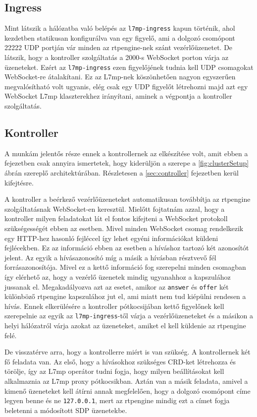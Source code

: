 \subsection{Ingress}

Mint látszik a hálózatba való belépés az \texttt{l7mp-ingress} kapun történik, ahol 
kezdetben statikusan konfigurálva van egy figyelő, ami a dolgozó csomópont 22222 UDP 
portján vár minden az rtpengine-nek szánt vezérlőüzenetet. De látszik, hogy a kontroller 
szolgáltatás a 2000-s WebSocket porton várja az üzeneteket. Ezért az 
\texttt{l7mp-ingress} ezen figyelőjének tudnia kell UDP csomagokat WebSocket-re 
átalakítani. Ez az L7mp-nek köszönhetően nagyon egyszerűen megvalósítható volt ugyanis, 
elég csak egy UDP figyelőt létrehozni majd azt egy WebSocket L7mp klaszterekhez 
irányítani, aminek a végpontja a kontroller szolgáltatás. 

\subsection{Kontroller}

A munkám jelentős része ennek a kontrollernek az elkészítése volt, amit ebben a
fejezetben csak annyira ismertetek, hogy kiderüljön a szerepe a \ref{fig:clusterSetup}
ábrán szereplő architektúrában. Részletesen a \ref{sec:controller} fejezetben kerül 
kifejtésre. 

A kontroller a beérkező vezérlőüzeneteket automatikusan továbbítja az rtpengine 
szolgáltatásnak WebSocket-en keresztül. Mielőtt fojtatnám azzal, hogy a kontroller milyen 
feladatokat lát el fontos kifejteni a WebSocket protokoll szükségességét ebben az esetben.
Mivel minden WebSocket csomag rendelkezik egy HTTP-hez hasonló fejléccel így
lehet egyéni információkat küldeni fejlécekben. Ez az információ ebben az esetben a 
híváshoz tartozó  két azonosítót jelent. Az egyik a hívásazonosító míg a másik a hívásban 
résztvevő fél forrásazonosítója. Mivel ez a kettő információ fog szerepelni minden 
csomagban így elérhető az, hogy a vezérlő üzenetek mindig ugyanahhoz a kapszulához 
jussanak el.  Megakadályozva azt az esetet, amikor az \texttt{answer} és \texttt{offer} 
két különböző rtpengine kapszulához jut el, ami miatt nem tud kiépülni rendesen a hívás. 
Ennek elkerülésére a kontroller pótkocsijában kettő figyelőnek kell szerepelnie az egyik 
az \texttt{l7mp-ingress}-től várja a vezérlőüzeneteket és a másikon a helyi hálózatról 
várja azokat az üzeneteket, amiket el kell küldenie az rtpengine felé. 

De visszatérve arra, hogy a kontrollerre miért is van szükség. A kontrollernek két fő 
feladata van. Az első, hogy a hívásokhoz szükséges CRD-ket létrehozza és törölje, így az 
L7mp operátor tudni fogja, hogy milyen beállításokat kell alkalmaznia az L7mp proxy 
pótkocsikban. Aztán van a másik feladata, amivel a kimenő üzeneteket kell átírni annak 
megfelelően, hogy a dolgozó csomópont címe legyen benne és ne \texttt{127.0.0.1}, mert az 
rtpengine mindig ezt a címet fogja beletenni a módosított SDP üzenetekbe. 

